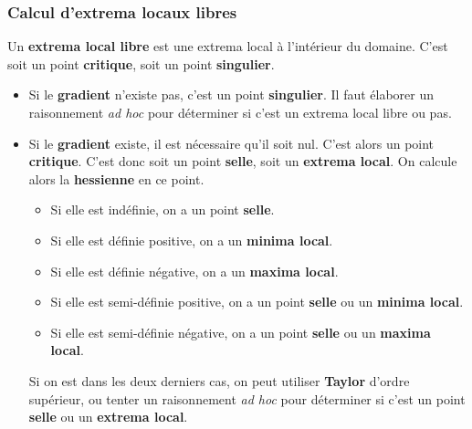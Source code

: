 \documentclass[11pt,a4paper]{article}
\theoremstyle{definition}
\begin{document}
\subsubsection{Calcul d'extrema locaux libres}
Un \textbf{extrema local libre} est une extrema local à l'intérieur du domaine.
C'est soit un point \textbf{critique}, soit un point \textbf{singulier}.
\begin{itemize}
	\item Si le \textbf{gradient} n'existe pas, c'est un point \textbf{singulier}.
		Il faut élaborer un raisonnement \emph{ad hoc} pour déterminer si c'est un extrema local libre ou pas.
	\item Si le \textbf{gradient} existe, il est nécessaire qu'il soit nul.
		C'est alors un point \textbf{critique}.
		C'est donc soit un point \textbf{selle}, soit un \textbf{extrema local}.
		On calcule alors la \textbf{hessienne} en ce point.
		\begin{itemize}
			\item Si elle est indéfinie, on a un point \textbf{selle}.
			\item Si elle est définie positive, on a un \textbf{minima local}.
			\item Si elle est définie négative, on a un \textbf{maxima local}.
			\item Si elle est semi-définie positive, on a un point \textbf{selle} ou un \textbf{minima local}.
			\item Si elle est semi-définie négative, on a un point \textbf{selle} ou un \textbf{maxima local}.
		\end{itemize}
		Si on est dans les deux derniers cas, on peut utiliser \textbf{Taylor} d'ordre supérieur, ou tenter un raisonnement \emph{ad hoc} pour déterminer si c'est un point \textbf{selle} ou un \textbf{extrema local}.
\end{itemize}
\end{document}
